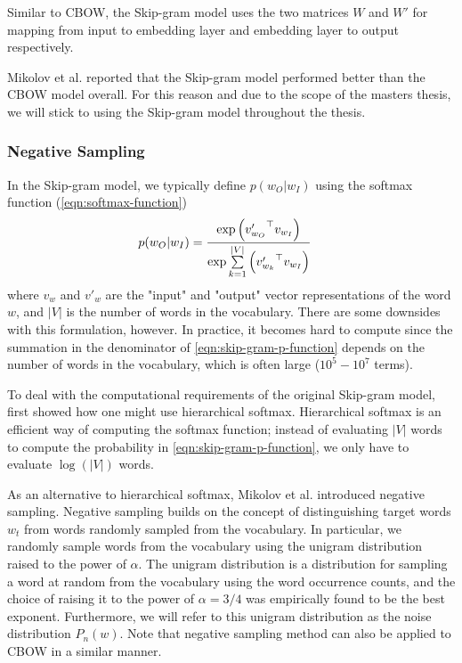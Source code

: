 Similar to CBOW, the Skip-gram model uses the two matrices $W$ and $W'$ for mapping from input to embedding layer and embedding layer to output respectively.

Mikolov et al. reported that the Skip-gram model performed better than the CBOW model overall. For this reason and due to the scope of the masters thesis, we will stick to using the Skip-gram model throughout the thesis.

\subsubsection{Negative Sampling}
In the Skip-gram model, we typically define $p(w_O | w_I)$ using the softmax function (\cref{eqn:softmax-function})
\begin{align}
    p(w_O | w_I)
    &= \frac{\exp{ \left( {v'_{w_O}}^\top v_{w_I} \right) }} {\exp{ \sum\limits_{k=1}^{|V|} \left( {v'_{w_k}}^\top v_{w_I} \right) }}
    \label{eqn:skip-gram-p-function}
\end{align}
where $v_w$ and $v'_w$ are the "input" and "output" vector representations of the word $w$, and $|V|$ is the number of words in the vocabulary. There are some downsides with this formulation, however. In practice, it becomes hard to compute since the summation in the denominator of \cref{eqn:skip-gram-p-function} depends on the number of words in the vocabulary, which is often large ($10^5 - 10^7$ terms).

To deal with the computational requirements of the original Skip-gram model, \cite{mikolov2013b} first showed how one might use hierarchical softmax. Hierarchical softmax is an efficient way of computing the softmax function; instead of evaluating $|V|$ words to compute the probability in \cref{eqn:skip-gram-p-function}, we only have to evaluate $\log \left( |V| \right)$ words.

As an alternative to hierarchical softmax, Mikolov et al. introduced negative sampling. Negative sampling builds on the concept of distinguishing target words $w_t$ from words randomly sampled from the vocabulary. In particular, we randomly sample words from the vocabulary using the unigram distribution raised to the power of $\alpha$. The unigram distribution is a distribution for sampling a word at random from the vocabulary using the word occurrence counts, and the choice of raising it to the power of $\alpha = 3/4$ was empirically found to be the best exponent. Furthermore, we will refer to this unigram distribution as the noise distribution $P_n(w)$. Note that negative sampling method can also be applied to CBOW in a similar manner.

